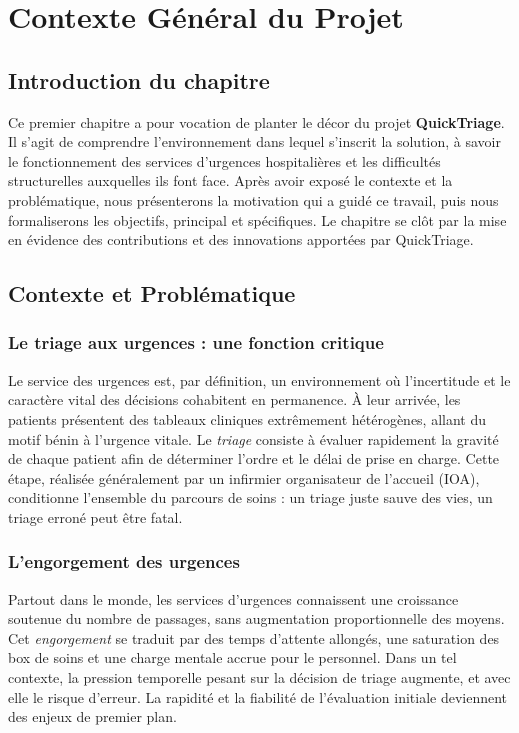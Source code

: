\chapter{Contexte Général du Projet}

\section*{Introduction du chapitre}
Ce premier chapitre a pour vocation de planter le décor du projet \textbf{QuickTriage}.
Il s'agit de comprendre l'environnement dans lequel s'inscrit la solution, à savoir le
fonctionnement des services d'urgences hospitalières et les difficultés structurelles
auxquelles ils font face. Après avoir exposé le contexte et la problématique, nous
présenterons la motivation qui a guidé ce travail, puis nous formaliserons les objectifs,
principal et spécifiques. Le chapitre se clôt par la mise en évidence des contributions et
des innovations apportées par QuickTriage.

\section{Contexte et Problématique}

\subsection{Le triage aux urgences : une fonction critique}
Le service des urgences est, par définition, un environnement où l'incertitude et le
caractère vital des décisions cohabitent en permanence. À leur arrivée, les patients
présentent des tableaux cliniques extrêmement hétérogènes, allant du motif bénin à
l'urgence vitale. Le \textit{triage} consiste à évaluer rapidement la gravité de chaque
patient afin de déterminer l'ordre et le délai de prise en charge. Cette étape, réalisée
généralement par un infirmier organisateur de l'accueil (IOA), conditionne l'ensemble du
parcours de soins : un triage juste sauve des vies, un triage erroné peut être fatal.

\subsection{L'engorgement des urgences}
Partout dans le monde, les services d'urgences connaissent une croissance soutenue du
nombre de passages, sans augmentation proportionnelle des moyens. Cet
\textit{engorgement} se traduit par des temps d'attente allongés, une saturation des box
de soins et une charge mentale accrue pour le personnel. Dans un tel contexte, la pression
temporelle pesant sur la décision de triage augmente, et avec elle le risque d'erreur.
La rapidité et la fiabilité de l'évaluation initiale deviennent des enjeux de premier plan.

